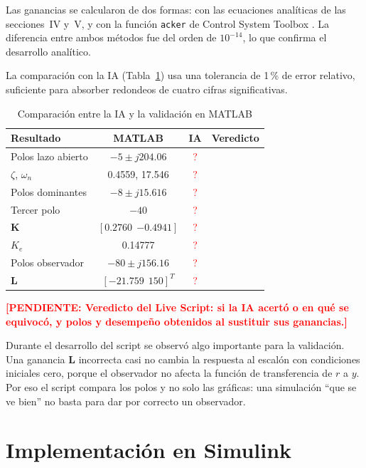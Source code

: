 \documentclass[conference,a4paper]{IEEEtran}
\newcommand{\pendiente}[1]{\textcolor{red}{\textbf{[PENDIENTE: #1]}}}
\begin{document}
Las ganancias se calcularon de dos formas: con las ecuaciones analíticas de las secciones~IV y~V, y con la función \texttt{acker} de Control System Toolbox \cite{matlab}. La diferencia entre ambos métodos fue del orden de $10^{-14}$, lo que confirma el desarrollo analítico.

La comparación con la IA (Tabla~\ref{tab:comparacion}) usa una tolerancia de 1\,\% de error relativo, suficiente para absorber redondeos de cuatro cifras significativas.

\begin{table}[!t]
\centering
\caption{Comparación entre la IA y la validación en MATLAB}
\small\setlength{\tabcolsep}{4pt}
\label{tab:comparacion}
\begin{tabular}{lccc}
\toprule
Resultado & MATLAB & IA & Veredicto \\
\midrule
Polos lazo abierto & $-5 \pm j204.06$ & \textcolor{red}{?} & \\
$\zeta$, $\omega_n$ & 0.4559, 17.546 & \textcolor{red}{?} & \\
Polos dominantes & $-8 \pm j15.616$ & \textcolor{red}{?} & \\
Tercer polo & $-40$ & \textcolor{red}{?} & \\
$\mathbf{K}$ & $[0.2760\ \ {-0.4941}]$ & \textcolor{red}{?} & \\
$K_e$ & 0.14777 & \textcolor{red}{?} & \\
Polos observador & $-80 \pm j156.16$ & \textcolor{red}{?} & \\
$\mathbf{L}$ & $[-21.759\ \ 150]^T$ & \textcolor{red}{?} & \\
\bottomrule
\end{tabular}
\end{table}

\pendiente{Veredicto del Live Script: si la IA acertó o en qué se equivocó, y polos y desempeño obtenidos al sustituir sus ganancias.}

Durante el desarrollo del script se observó algo importante para la validación. Una ganancia $\mathbf{L}$ incorrecta casi no cambia la respuesta al escalón con condiciones iniciales cero, porque el observador no afecta la función de transferencia de $r$ a $y$. Por eso el script compara los polos y no solo las gráficas: una simulación ``que se ve bien'' no basta para dar por correcto un observador.

\section{Implementación en Simulink}
\end{document}
